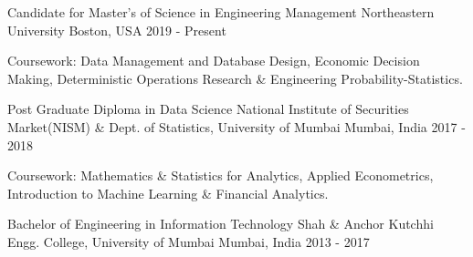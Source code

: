 

\begin{cventries}

 \cventry
    {Candidate for Master's of Science in Engineering Management} %
    {Northeastern University} %
    {Boston, USA} %
    {2019 - Present} %
    {\begin{cvitems} %
        \item {Coursework: Data Management and Database Design, Economic Decision Making, Deterministic Operations Research \& Engineering Probability-Statistics.}
      \end{cvitems}
      \vspace{-1\baselineskip} %
      }
 \cventry
    {Post Graduate Diploma in Data Science} %
    {National Institute of Securities Market(NISM) \& Dept. of Statistics, University of Mumbai} %
    {Mumbai, India} %
    {2017 - 2018} %
    {
      \begin{cvitems} %
       \item{Coursework: Mathematics \& Statistics for Analytics, Applied Econometrics, Introduction to Machine Learning \& Financial Analytics.}
      \end{cvitems}
      \vspace{-.65\baselineskip} 
    } 
  \cventry
    {Bachelor of Engineering in Information Technology} %
    {Shah \& Anchor Kutchhi Engg. College, University of Mumbai} %
    {Mumbai, India} %
    {2013 - 2017} %
    {
      \begin{cvitems} %
      \end{cvitems}
      \vspace{-.65\baselineskip} 
    }
\end{cventries}
\vspace{-1.75\baselineskip} 